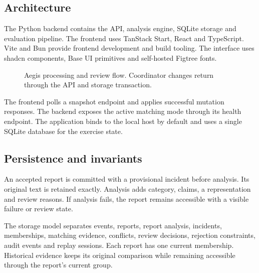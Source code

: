 \documentclass[11pt,a4paper]{article}
\begin{document}
\subsection{Architecture}
The Python backend contains the API, analysis engine, SQLite storage and evaluation pipeline. The frontend uses TanStack Start, React and TypeScript. Vite and Bun provide frontend development and build tooling. The interface uses shadcn components, Base UI primitives and self-hosted Figtree fonts.

\begin{figure}[H]
\centering
{}
\caption{Aegis processing and review flow. Coordinator changes return through the API and storage transaction.}
\label{fig:architecture}
\end{figure}

The frontend polls a snapshot endpoint and applies successful mutation responses. The backend exposes the active matching mode through its health endpoint. The application binds to the local host by default and uses a single SQLite database for the exercise state.

\subsection{Persistence and invariants}
An accepted report is committed with a provisional incident before analysis. Its original text is retained exactly. Analysis adds category, claims, a representation and review reasons. If analysis fails, the report remains accessible with a visible failure or review state.

The storage model separates events, reports, report analysis, incidents, memberships, matching evidence, conflicts, review decisions, rejection constraints, audit events and replay sessions. Each report has one current membership. Historical evidence keeps its original comparison while remaining accessible through the report's current group.
\end{document}
